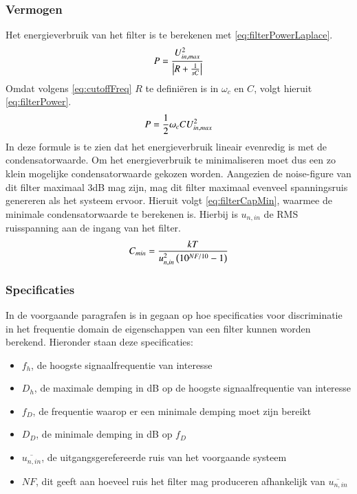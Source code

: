 \subsubsection{Vermogen}
Het energieverbruik van het filter is te berekenen met \cref{eq:filterPowerLaplace}.
\begin{equation} \label{eq:filterPowerLaplace}
    P = \frac{U_{in,max}^2}{\left|R + \frac{1}{sC}\right|}
    \tagaddtext{[\si{\watt}]}
\end{equation}
Omdat volgens \cref{eq:cutoffFreq} $R$ te definiëren is in $\omega_c$ en $C$, volgt hieruit \cref{eq:filterPower}.
\begin{equation} \label{eq:filterPower}
    P = \frac{1}{2}\omega_cCU_{in,max}^2
    \tagaddtext{[\si{\watt}]}
\end{equation}
In deze formule is te zien dat het energieverbruik lineair evenredig is met de condensatorwaarde. Om het energieverbruik te minimaliseren moet dus een zo klein mogelijke condensatorwaarde gekozen worden. Aangezien de noise-figure van dit filter maximaal 3dB mag zijn, mag dit filter maximaal evenveel spanningsruis genereren als het systeem ervoor. Hieruit volgt \cref{eq:filterCapMin}, waarmee de minimale condensatorwaarde te berekenen is. Hierbij is $u_{n,in}$ de RMS ruisspanning aan de ingang van het filter.
\begin{equation} \label{eq:filterCapMin}
    C_{min} = \frac{kT}{u_{n,in}^2\left(10^{NF/10}-1\right)}
    \tagaddtext{[\si{\farad}]}
\end{equation}

\subsubsection{Specificaties}
In de voorgaande paragrafen is in gegaan op hoe specificaties voor discriminatie in het frequentie domain de eigenschappen van een filter kunnen worden berekend. Hieronder staan deze specificaties:
\begin{itemize}
    \item $f_h$, de hoogste signaalfrequentie van interesse
    \item $D_h$, de maximale demping in dB op de hoogste signaalfrequentie van interesse
    \item $f_D$, de frequentie waarop er een minimale demping moet zijn bereikt
    \item $D_D$, de minimale demping in dB op $f_D$
    \item $\overline{u_{n,in}}$, de uitgangsgerefereerde ruis van het voorgaande systeem
    \item $NF$, dit geeft aan hoeveel ruis het filter mag produceren afhankelijk van $\overline{u_{n,in}}$
\end{itemize}

